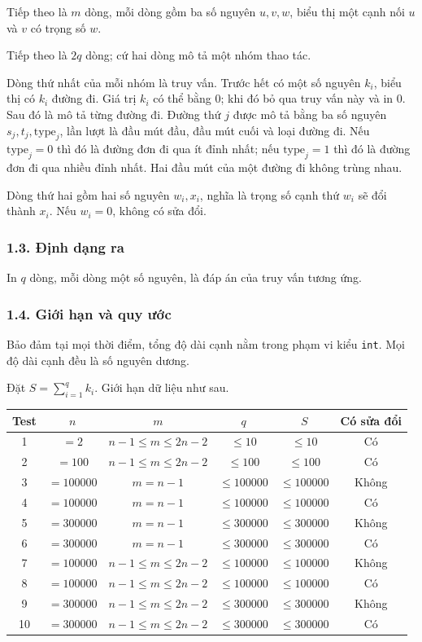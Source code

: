\documentclass[11pt]{article}
\begin{document}
Tiếp theo là \(m\) dòng, mỗi dòng gồm ba số nguyên \(u,v,w\), biểu thị một
cạnh nối \(u\) và \(v\) có trọng số \(w\).

Tiếp theo là \(2q\) dòng; cứ hai dòng mô tả một nhóm thao tác.

Dòng thứ nhất của mỗi nhóm là truy vấn. Trước hết có một số nguyên \(k_i\),
biểu thị có \(k_i\) đường đi. Giá trị \(k_i\) có thể bằng \(0\); khi đó bỏ qua
truy vấn này và in \(0\). Sau đó là mô tả từng đường đi. Đường thứ \(j\) được
mô tả bằng ba số nguyên \(s_j,t_j,\mathrm{type}_j\), lần lượt là đầu mút đầu,
đầu mút cuối và loại đường đi. Nếu \(\mathrm{type}_j=0\) thì đó là đường đơn
đi qua ít đỉnh nhất; nếu \(\mathrm{type}_j=1\) thì đó là đường đơn đi qua
nhiều đỉnh nhất. Hai đầu mút của một đường đi không trùng nhau.

Dòng thứ hai gồm hai số nguyên \(w_i,x_i\), nghĩa là trọng số cạnh thứ \(w_i\)
sẽ đổi thành \(x_i\). Nếu \(w_i=0\), không có sửa đổi.

\subsubsection*{1.3. Định dạng ra}

In \(q\) dòng, mỗi dòng một số nguyên, là đáp án của truy vấn tương ứng.

\subsubsection*{1.4. Giới hạn và quy ước}

Bảo đảm tại mọi thời điểm, tổng độ dài cạnh nằm trong phạm vi kiểu
\texttt{int}. Mọi độ dài cạnh đều là số nguyên dương.

Đặt \(S=\sum_{i=1}^{q} k_i\). Giới hạn dữ liệu như sau.

\begin{center}
\small
\begin{tabular}{c c c c c c}
\textbf{Test} & \(n\) & \(m\) & \(q\) & \(S\) & \textbf{Có sửa đổi} \\
\hline
1 & \(=2\) & \(n-1\le m\le 2n-2\) & \(\le 10\) & \(\le 10\) & Có \\
2 & \(=100\) & \(n-1\le m\le 2n-2\) & \(\le 100\) & \(\le 100\) & Có \\
3 & \(=100000\) & \(m=n-1\) & \(\le 100000\) & \(\le 100000\) & Không \\
4 & \(=100000\) & \(m=n-1\) & \(\le 100000\) & \(\le 100000\) & Có \\
5 & \(=300000\) & \(m=n-1\) & \(\le 300000\) & \(\le 300000\) & Không \\
6 & \(=300000\) & \(m=n-1\) & \(\le 300000\) & \(\le 300000\) & Có \\
7 & \(=100000\) & \(n-1\le m\le 2n-2\) & \(\le 100000\) & \(\le 100000\) & Không \\
8 & \(=100000\) & \(n-1\le m\le 2n-2\) & \(\le 100000\) & \(\le 100000\) & Có \\
9 & \(=300000\) & \(n-1\le m\le 2n-2\) & \(\le 300000\) & \(\le 300000\) & Không \\
10 & \(=300000\) & \(n-1\le m\le 2n-2\) & \(\le 300000\) & \(\le 300000\) & Có
\end{tabular}
\end{center}
\end{document}
